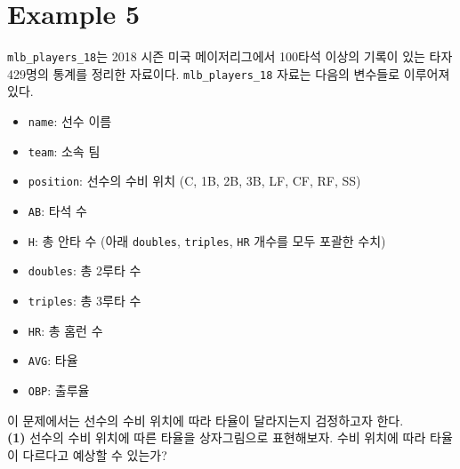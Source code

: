 \documentclass{article}
\begin{document}
\section*{Example 5}
\texttt{mlb\_players\_18}는 2018 시즌 미국 메이저리그에서 100타석 이상의 기록이 있는 타자 429명의
통계를 정리한 자료이다. \texttt{mlb\_players\_18} 자료는 다음의 변수들로 이루어져 있다.
\begin{itemize}
  \setlength\itemsep{-0.4em}
    \item \texttt{name}: 선수 이름
    \item \texttt{team}: 소속 팀
    \item \texttt{position}: 선수의 수비 위치 (C, 1B, 2B, 3B, LF, CF, RF, SS)
    \item \texttt{AB}: 타석 수
    \item \texttt{H}: 총 안타 수 (아래 \texttt{doubles}, \texttt{triples}, \texttt{HR} 개수를 모두 포괄한 수치)
    \item \texttt{doubles}: 총 2루타 수
    \item \texttt{triples}: 총 3루타 수
    \item \texttt{HR}: 총 홈런 수
    \item \texttt{AVG}: 타율
    \item \texttt{OBP}: 출루율
\end{itemize}
이 문제에서는 선수의 수비 위치에 따라 타율이 달라지는지 검정하고자 한다. \\

\textbf{(1)} 선수의 수비 위치에 따른 타율을 상자그림으로 표현해보자. 수비 위치에 따라 타율이 다르다고 예상할 수 있는가?
\end{document}
